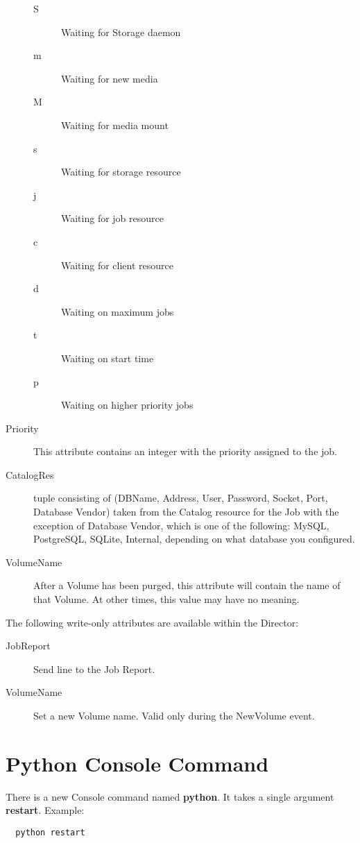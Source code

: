 \begin{description}
\begin{description}
       \item [S] Waiting for Storage daemon
       \item [m] Waiting for new media
       \item [M] Waiting for media mount
       \item [s] Waiting for storage resource
       \item [j] Waiting for job resource
       \item [c] Waiting for client resource
       \item [d] Waiting on maximum jobs
       \item [t] Waiting on start time
       \item [p] Waiting on higher priority jobs
       \end{description}

\item [Priority]  This attribute contains an integer with the priority
       assigned to the job.
\item [CatalogRes] tuple consisting of (DBName, Address, User,
       Password, Socket, Port, Database Vendor) taken from the Catalog resource 
       for the Job with the exception of Database Vendor, which is
       one of the following: MySQL, PostgreSQL, SQLite, Internal,
       depending on what database you configured.
\item [VolumeName]
       After a Volume has been purged, this attribute will contain the
       name of that Volume. At other times, this value may have no meaning.
\end{description}

The following write-only attributes are available within the
Director:

\begin{description}
\item [JobReport] Send line to the Job Report.
\item [VolumeName] Set a new Volume name. Valid only during the
   NewVolume event.
\end{description}

\section{Python Console Command}

There is a new Console command named {\bf python}. It takes
a single argument {\bf restart}. Example:
\begin{verbatim}
  python restart
\end{verbatim}

